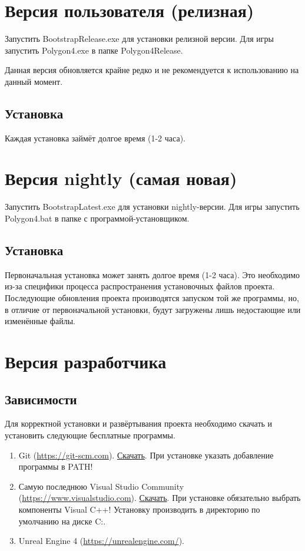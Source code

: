 \documentclass[a4paper,12pt]{report}
\begin{document}
\section{Версия пользователя (релизная)}

Запустить BootstrapRelease.exe для установки релизной версии.
Для игры запустить Polygon4.exe в папке Polygon4Release.

Данная версия обновляется крайне редко и не рекомендуется к использованию на данный момент.

\subsection{Установка}

Каждая установка займёт долгое время (1-2 часа).

\section{Версия nightly (самая новая)}

Запустить BootstrapLatest.exe для установки nightly-версии.
Для игры запустить Polygon4.bat в папке с программой-установщиком.

\subsection{Установка}

Первоначальная установка может занять долгое время (1-2 часа).
Это необходимо из-за специфики процесса распространения установочных файлов проекта.
Последующие обновления проекта производятся запуском той же программы, но, в отличие от первоначальной установки, будут загружены лишь недостающие или изменённые файлы.


\section{Версия разработчика}

\subsection{Зависимости}

Для корректной установки и развёртывания проекта необходимо скачать и установить следующие бесплатные программы.

\begin{enumerate}
\item Git (\url{https://git-scm.com}). \href{https://git-scm.com/download/win}{Скачать}. При установке указать добавление программы в PATH!
\item Самую последнюю Visual Studio Community (\url{https://www.visualstudio.com}). \href{https://visualstudio.microsoft.com/downloads/}{Скачать}. При установке обязательно выбрать компоненты Visual C++! Установку производить в директорию по умолчанию на диске C:.
\item Unreal Engine 4 (\url{https://unrealengine.com/}).
\end{enumerate}
\end{document}
